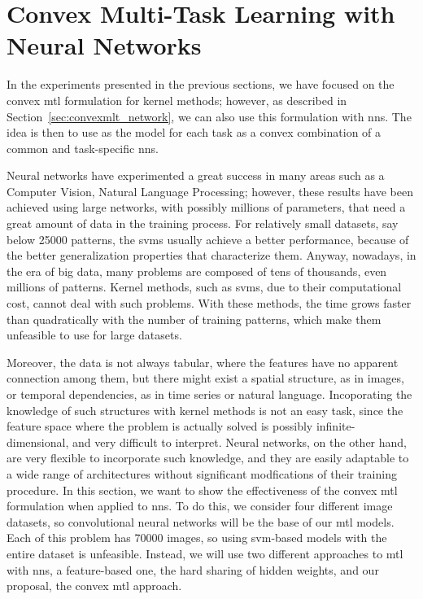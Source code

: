 \section{Convex Multi-Task Learning with Neural Networks}\label{sec:convexmtl_nn_experiments}
%
In the experiments presented in the previous sections, we have focused on the convex \acrshort{mtl} formulation for kernel methods; however, as described in Section~\ref{sec:convexmlt_network}, we can also use this formulation with \acrshort{nns}. The idea is then to use as the model for each task as a convex combination of a common and task-specific \acrshort{nns}.

%
Neural networks have experimented a great success in many areas such as a Computer Vision, Natural Language Processing; however, these results have been achieved using large networks, with possibly millions of parameters, that need a great amount of data in the training process. For relatively small datasets, say below \num{25000} patterns, the \acrshort{svms} usually achieve a better performance, because of the better generalization properties that characterize them.
%
Anyway, nowadays, in the era of big data, many problems are composed of tens of thousands, even millions of patterns. Kernel methods, such as \acrshort{svms}, due to their computational cost, cannot deal with such problems. With these methods, the time grows faster than quadratically with the number of training patterns, which make them unfeasible to use for large datasets.
%

Moreover, the data is not always tabular, where the features have no apparent connection among them, but there might exist a spatial structure, as in images, or temporal dependencies, as in time series or natural language. Incoporating the knowledge of such structures with kernel methods is not an easy task, since the feature space where the problem is actually solved is possibly infinite-dimensional, and very difficult to interpret. Neural networks, on the other hand, are very flexible to incorporate such knowledge, and they are easily adaptable to a wide range of architectures without significant modfications of their training procedure.
%
In this section, we want to show the effectiveness of the convex \acrshort{mtl} formulation when applied to \acrshort{nns}. To do this, we consider four different image datasets, so convolutional neural networks will be the base of our \acrshort{mtl} models. Each of this problem has \num{70000} images, so using \acrshort{svm}-based models with the entire dataset is unfeasible. Instead, we will use two different approaches to \acrshort{mtl} with \acrshort{nns}, a feature-based one, the hard sharing of hidden weights, and our proposal, the convex \acrshort{mtl} approach.


